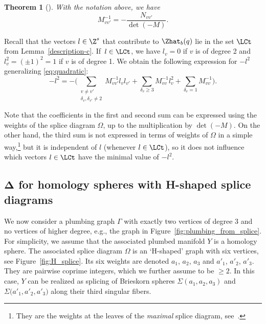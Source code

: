 \documentclass[pdftex]{sigma}
\newtheorem{Theorem}{Theorem}[section]
\begin{document}
\begin{Theorem}[{\cite[Theorem~12.2]{NW05a}}]\label{theorem:neumann} With the notation above, we have
 \[
 M^{-1}_{vv'} = -\frac{N_{vv'}}{\det(- M)}.
 \]
\end{Theorem}

Recall that the vectors $l \in \Z^s$ that contribute to $\Zhat_b(q)$ lie in the set $\LCt$ from Lemma~\ref{description-c}. If~${l \in \LCt}$, we have $l_v=0$ if $v$ is of degree 2 and $l_v^2 = (\pm 1)^2=1$ if $v$ is of degree 1. We obtain the following expression for $-l^2$ generalizing \eqref{eq:quadratic}:
\begin{equation*}%
 -l^2 = - \biggl(\sum_{\substack{v \neq v'\\ \delta_v,\delta_{v'} \neq 2}} M^{-1}_{vv'} l_v l_{v'} + \sum_{\delta_v \geq 3} M^{-1}_{vv} l_v^2 + \sum_{\delta_v =1} M^{-1}_{vv} \biggr).
\end{equation*}

Note that the coefficients in the first and second sum can be expressed using the weights of the splice diagram $\Omega$, up to the multiplication by $\det(- M)$. On the other hand, the third sum is not expressed in terms of weights of $\Omega$ in a simple way,\footnote{They are the weights at the leaves of the \emph{maximal} splice diagram, see~\cite[p.~743]{NW05a}.} but it is independent of $l$ (whenever $l \in \LCt$), so it does not influence which vectors $l \in \LCt$ have the minimal value of $-l^2$.

\subsection[Delta for homology spheres with H-shaped splice diagrams]{$\boldsymbol{\Delta}$ for homology spheres with H-shaped splice diagrams} \label{ss:computation_h_shaped}

We now consider a plumbing graph $\Gamma$ with exactly two vertices of degree 3 and no vertices of higher degree, e.g., the graph in Figure~\ref{fig:plumbing_from_splice}. For simplicity, we assume that the associated plumbed manifold $Y$ is a homology sphere. The associated splice diagram $\Omega$ is an `H-shaped' graph with six vertices, see Figure~\ref{fig:H_splice}. Its six weights are denoted $a_1$, $a_2$, $a_3$ and $a'_1$, $a'_2$, $a'_3$. They are pairwise coprime integers, which we further assume to be $\geq 2$. In this case, $Y$ can be realized as splicing of Brieskorn spheres $\Sigma(a_1,a_2,a_3)$ and $\Sigma\bigl(a'_1,a'_2,a'_3\bigr)$ along their third singular fibers.
\end{document}
